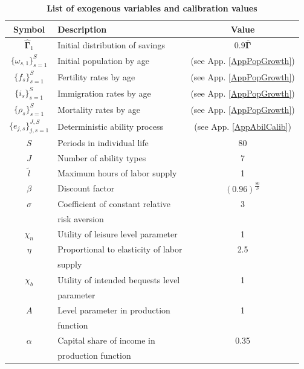 \documentclass[letterpaper,12pt]{article}
\theoremstyle{definition}
\begin{document}
\begin{spacing}{1.5}
    \begin{table}[htbp] \centering \captionsetup{width=4.4in}
    \caption{\label{TabExogVars}\textbf{List of exogenous variables and calibration values}}
      \begin{threeparttable}
      \begin{tabular}{>{\small}c |>{\small}l |>{\small}c}
        \hline\hline
        Symbol & \quad\quad\quad\quad Description & Value \\
        \hline
        $\bm{\hat{\Gamma}}_1$ & Initial distribution of savings & $0.9\bm{\bar{\Gamma}}$ \\
        $\{\omega_{s,1}\}_{s=1}^S$ & Initial population by age & (see App. \ref{AppPopGrowth}) \\
        $\{f_s\}_{s=1}^S$ & Fertility rates by age & (see App. \ref{AppPopGrowth}) \\
        $\{i_s\}_{s=1}^S$ & Immigration rates by age & (see App. \ref{AppPopGrowth}) \\
        $\{\rho_s\}_{s=1}^S$ & Mortality rates by age & (see App. \ref{AppPopGrowth}) \\
        $\{e_{j,s}\}_{j,s=1}^{J,S}$ & Deterministic ability process & (see App. \ref{AppAbilCalib}) \\
        $S$ & Periods in individual life & 80 \\
        $J$ & Number of ability types & 7 \\
        $\tilde{l}$ & Maximum hours of labor supply & 1 \\
        $\beta$ & Discount factor & $(0.96)^\frac{80}{S}$ \\
        $\sigma$ & Coefficient of constant relative & 3 \\
        & \quad risk aversion & \\
        $\chi_n$ & Utility of leisure level parameter & 1 \\
        $\eta$ & Proportional to elasticity of labor & 2.5 \\
        & \quad supply & \\
        $\chi_b$ & Utility of intended bequests level & 1 \\
        & \quad parameter & \\
        $A$ & Level parameter in production & 1 \\
        & \quad function & \\
        $\alpha$ & Capital share of income in & 0.35 \\
        & \quad production function & \\

\end{tabular}
\end{threeparttable}
\end{table}
\end{spacing}
\end{document}
